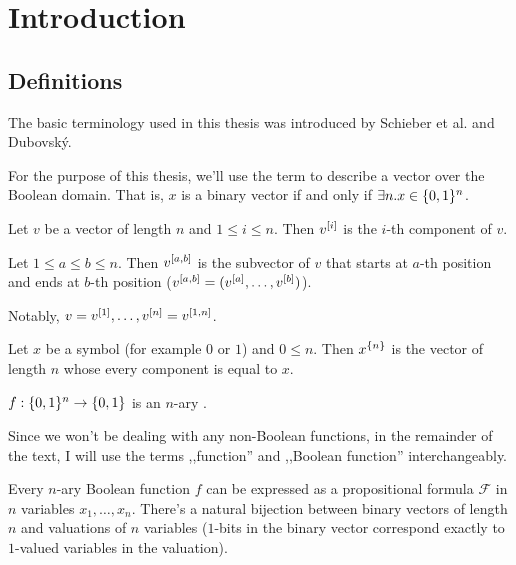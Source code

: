 \chapter*{Introduction}

\section{Definitions}

The basic terminology used in this thesis
was introduced by Schieber et al.\cite{Schieber2005154}
and Dubovský.\cite{Dubovsky2012}

\begin{definition}
For the purpose of this thesis,
we'll use the term 
to describe a vector over the Boolean domain.
That is, $x$ is a binary vector if and only if
$\exists n. x \in \{0, 1\}^n$.
\end{definition}

\begin{definition}
Let $v$ be a vector of length $n$ and $1 \leq i \leq n$.
Then $v^{[i]}$ is the $i$-th component of $v$.

Let $1 \leq a \leq b \leq n$.
Then $v^{[a, b]}$ is the subvector of $v$
that starts at $a$-th position
and ends at $b$-th position
($v^{[a, b]} = (v^{[a]}, \ldots, v^{[b]})$).
\end{definition}

Notably,
$v = v^{[1]}, \ldots, v^{[n]} = v^{[1, n]}$.

\begin{definition}
Let $x$ be a symbol (for example $0$ or $1$)
and $0 \leq n$.
Then $x^{\{n\}}$ is the vector of length $n$
whose every component is equal to $x$.
\end{definition}

\begin{definition}
$f: \{0, 1\}^n \rightarrow \{0, 1\}$ is an $n$-ary
.
\end{definition}

Since we won't be dealing with any non-Boolean functions,
in the remainder of the text,
I will use the terms ,,function'' and ,,Boolean function''
interchangeably.

Every $n$-ary Boolean function $f$ can be expressed
as a propositional formula $\mathcal{F}$ in $n$ variables
$x_1, \ldots, x_n$.
There's a natural bijection
between binary vectors of length $n$
and valuations of $n$ variables
($1$-bits in the binary vector
correspond exactly to $1$-valued variables
in the valuation).


